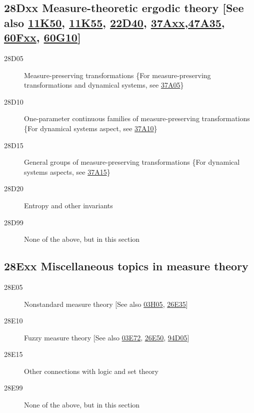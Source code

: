 \documentclass[letterpaper]{article}
\begin{document}
\subsection*{28Dxx  Measure-theoretic ergodic theory [See also \hyperref[11K50]{11K50}, \hyperref[11K55]{11K55}, \hyperref[22D40]{22D40}, \hyperref[37Axx]{37Axx},\newline \hyperref[47A35]{47A35}, \hyperref[60Fxx]{60Fxx}, \hyperref[60G10]{60G10}] }\label{28Dxx}
\begin{description}  
\item [28D05]\label{28D05} Measure-preserving transformations \{For measure-preserving transformations and dynamical systems, see \hyperref[37A05]{37A05}\}
\item [28D10]\label{28D10} One-parameter continuous families of measure-preserving transformations \{For dynamical systems aspect, see \hyperref[37A10]{37A10}\}
\item [28D15]\label{28D15} General groups of measure-preserving transformations \{For dynamical systems aspects, see \hyperref[37A15]{37A15}\} 
\item [28D20]\label{28D20} Entropy and other invariants
\item [28D99]\label{28D99} None of the above, but in this section
\end{description}
\subsection*{28Exx  Miscellaneous topics in measure theory }\label{28Exx}
\begin{description}  
\item [28E05]\label{28E05} Nonstandard measure theory [See also \hyperref[03H05]{03H05}, \hyperref[26E35]{26E35}]
\item [28E10]\label{28E10} Fuzzy measure theory [See also \hyperref[03E72]{03E72}, \hyperref[26E50]{26E50}, \hyperref[94D05]{94D05}]
\item [28E15]\label{28E15} Other connections with logic and set theory
\item [28E99]\label{28E99} None of the above, but in this section
\end{description}
\end{document}
